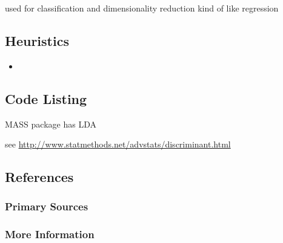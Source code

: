 used for classification and dimensionality reduction
kind of like regression


\subsection{Heuristics}

\begin{itemize}
	\item 
\end{itemize}

\subsection{Code Listing}

MASS package has LDA

see \url{http://www.statmethods.net/advstats/discriminant.html}

\subsection{References}

\subsubsection{Primary Sources}



\subsubsection{More Information}






